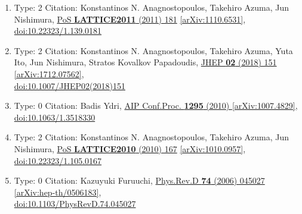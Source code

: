 \documentclass[a4paper,10pt]{article}
\begin{document}
\begin{enumerate}
\begin{enumerate}
  \item Type: 2 Citation: Konstantinos N. Anagnostopoulos, Takehiro Azuma, Jun Nishimura, \href{https://www.doi.org/10.22323/1.139.0181}{PoS {\bf LATTICE2011} (2011) 181}  \href{https://arxiv.org/abs/1110.6531}{[arXiv:1110.6531]},\\\href{https://www.doi.org/10.22323/1.139.0181}{doi:10.22323/1.139.0181}
  \item Type: 2 Citation: Konstantinos N. Anagnostopoulos, Takehiro Azuma, Yuta Ito, Jun Nishimura, Stratos Kovalkov Papadoudis, \href{https://www.doi.org/10.1007/JHEP02(2018)151}{JHEP {\bf 02} (2018) 151}  \href{https://arxiv.org/abs/1712.07562}{[arXiv:1712.07562]},\\\href{https://www.doi.org/10.1007/JHEP02(2018)151}{doi:10.1007/JHEP02(2018)151}
  \item Type: 0 Citation: Badis Ydri, \href{https://www.doi.org/10.1063/1.3518330}{AIP Conf.Proc. {\bf 1295} (2010) }  \href{https://arxiv.org/abs/1007.4829}{[arXiv:1007.4829]},\\\href{https://www.doi.org/10.1063/1.3518330}{doi:10.1063/1.3518330}
  \item Type: 2 Citation: Konstantinos N. Anagnostopoulos, Takehiro Azuma, Jun Nishimura, \href{https://www.doi.org/10.22323/1.105.0167}{PoS {\bf LATTICE2010} (2010) 167}  \href{https://arxiv.org/abs/1010.0957}{[arXiv:1010.0957]},\\\href{https://www.doi.org/10.22323/1.105.0167}{doi:10.22323/1.105.0167}
  \item Type: 0 Citation: Kazuyuki Furuuchi, \href{https://www.doi.org/10.1103/PhysRevD.74.045027}{Phys.Rev.D {\bf 74} (2006) 045027}  \href{https://arxiv.org/abs/hep-th/0506183}{[arXiv:hep-th/0506183]},\\\href{https://www.doi.org/10.1103/PhysRevD.74.045027}{doi:10.1103/PhysRevD.74.045027}

\end{enumerate}
\end{enumerate}
\end{document}
